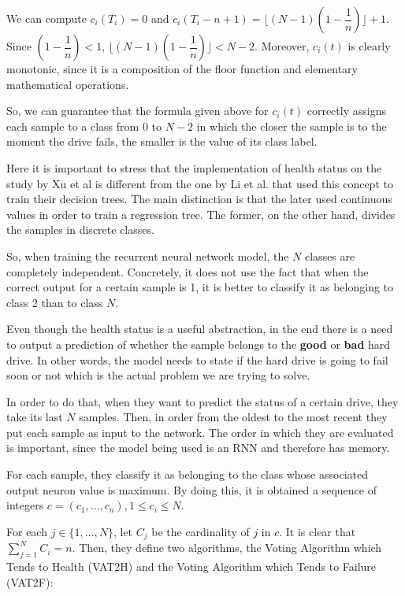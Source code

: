 We can compute $c_i(T_i) = 0$ and $c_i(T_i - n + 1) = \biggl\lfloor(N-1)\left(1-\dfrac{1}{n}\right)\biggr\rfloor + 1$.
Since $\left(1-\dfrac{1}{n}\right) < 1$, $\biggl\lfloor(N-1)\left(1-\dfrac{1}{n}\right)\biggr\rfloor < N - 2$.
Moreover, $c_i(t)$ is clearly monotonic, since it is a composition of the floor function and elementary mathematical operations.

So, we can guarantee that the formula given above for $c_i(t)$ correctly assigns each sample to a class from $0$ to $N-2$ in which the closer the sample is to the moment the drive fails, the smaller is the value of its class label.

Here it is important to stress that the implementation of health status on the study by Xu et al \cite{Xu16} is different from the one by Li et al. \cite{Li14} that used this concept to train their decision trees.
The main distinction is that the later used continuous values in order to train a regression tree.
The former, on the other hand, divides the samples in discrete classes.

So, when training the recurrent neural network model, the $N$ classes are completely independent.
Concretely, it does not use the fact that when the correct output for a certain sample is 1, it is better to classify it as belonging to class 2 than to class $N$.

Even though the health status is a useful abstraction, in the end there is a need to output a prediction of whether the sample belongs to the \textbf{good} or \textbf{bad} hard drive.
In other words, the model needs to state if the hard drive is going to fail soon or not which is the actual problem we are trying to solve.

In order to do that, when they want to predict the status of a certain drive, they take its last $N$ samples.
Then, in order from the oldest to the most recent they put each sample as input to the network.
The order in which they are evaluated is important, since the model being used is an RNN and therefore has memory.

For each sample, they classify it as belonging to the class whose associated output neuron value is maximum.
By doing this, it is obtained a sequence of integers $c = (c_1, \dots, c_n), 1 \leq c_i \leq N$.

For each $j \in \{1,\dots,N\}$, let $C_j$ be the cardinality of $j$ in $c$.
It is clear that $\sum_{j=1}^N C_i = n$.
Then, they define two algorithms, the Voting Algorithm which Tends to Health (VAT2H) and the Voting Algorithm which Tends to Failure (VAT2F):

